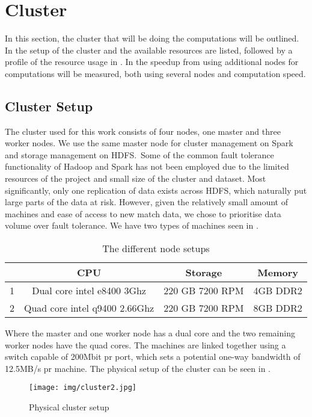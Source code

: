 \section{Cluster}\label{sec:cluster}
In this section, the cluster that will be doing the computations will be outlined. In  the setup of the cluster and the available resources are listed, followed by a profile of the resource usage in . In  the speedup from using additional nodes for computations will be measured, both using several nodes and computation speed.

\subsection{Cluster Setup}\label{sec:clustersetup}

The cluster used for this work consists of four nodes, one master and three worker nodes. We use the same master node for cluster management on Spark and storage management on HDFS.\ Some of the common fault tolerance functionality of Hadoop and Spark has not been employed due to the limited resources of the project and small size of the cluster and dataset. Most significantly, only one replication of data exists across HDFS, which naturally put large parts of the data at risk. However, given the relatively small amount of machines and ease of access to new match data, we chose to prioritise data volume over fault tolerance. We have two types of machines seen in .
\begin{table}[!htb]
  \centering
  \begin{tabular}{|r|ccc|}
    \hline
      & CPU & Storage & Memory \\\hline
    1 & Dual core intel e8400 3Ghz & 220 GB 7200 RPM & 4GB DDR2 \\
    2 & Quad core intel q9400 2.66Ghz & 220 GB 7200 RPM & 8GB DDR2 \\\hline
  \end{tabular}
  \caption{The different node setups}\label{tab:setups}
\end{table}

Where the master and one worker node has a dual core and the two remaining worker nodes have the quad cores. The machines are linked together using a switch capable of 200Mbit pr port, which sets a potential one-way bandwidth of 12.5MB/s pr machine. The physical setup of the cluster can be seen in .

\begin{figure}[!htb]
  \centering
    \texttt{[image: img/cluster2.jpg]}
  \caption{Physical cluster setup}\label{fig:clustersetup}
\end{figure}

